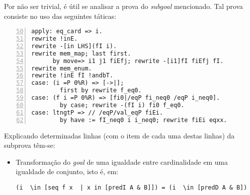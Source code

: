 \begin{enumerate}[label=\textbf{\roman*.}]
\begin{enumerate}[label=\textbf{\roman{enumi}.(\alph*)}]
\begin{enumerate}[label=\textbf{(\alph{enumii}.\arabic*)}]
\begin{enumerate}[listparindent=\parindent]
                                
                                Por não ser trivial, é útil se analisar a prova do \textit{subgoal} mencionado. Tal prova consiste no uso das seguintes táticas:
                                
                                        \begin{lstlisting}[language=coq,frame=single, numbers=left,stepnumber=1,tabsize=1, escapechar=@, firstnumber=50]
apply: eq_card => i.                                            @ \label{line:50-item4b-item2} @
rewrite !inE.                                                   @ \label{line:51-item4b-item2} @
rewrite -[in LHS](fI i).                                        @ \label{line:52-item4b-item2} @
rewrite mem_map; last first.                                    @ \label{line:53-item4b-item2} @
      by move=> i1 j1 fiEfj; rewrite -[i1]fI fiEfj fI.          @ \label{line:54-item4b-item2} @
rewrite mem_enum.                                               @ \label{line:55-item4b-item2} @
rewrite !inE fI !andbT.                                         @ \label{line:56-item4b-item2} @
case: (i =P 0%R) => [->|];                                      @ \label{line:57-item4b-item2} @
        first by rewrite f_eq0.                                 @ \label{line:58-item4b-item2} @
case: (f i =P 0%R) => [fi0|/eqP fi_neq0 /eqP i_neq0].           @ \label{line:59-item4b-item2} @
        by case; rewrite -(fI i) fi0 f_eq0.                     @ \label{line:60-item4b-item2} @
case: ltngtP => // /eqP/val_eqP fiEi.                           @ \label{line:61-item4b-item2} @
        by have := fI_neq0 i i_neq0; rewrite fiEi eqxx.         @ \label{line:62-item4b-item2} @
                                        \end{lstlisting}
                                Explicando determinadas linhas (com o item de cada uma destas linhas) da subprova têm-se:
                                        \begin{itemize}
                                                \item[\textbf{(\ref{line:50-item4b-item2})}] Transformação do \textit{goal} de uma igualdade entre cardinalidade em uma igualdade de conjunto, isto é, em:
                                                        \begin{lstlisting}[language=coq,frame=single,tabsize=1]
(i  \in [seq f x  | x in [predI A & B]]) = (i  \in [predD A & B])
                                                        \end{lstlisting}        
                                                

\end{itemize}
\end{enumerate}
\end{enumerate}
\end{enumerate}
\end{enumerate}
